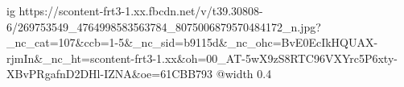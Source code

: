  
 
 
 
 

\ifcmt
  ig https://scontent-frt3-1.xx.fbcdn.net/v/t39.30808-6/269753549_4764998583563784_8075006879570484172_n.jpg?_nc_cat=107&ccb=1-5&_nc_sid=b9115d&_nc_ohc=BvE0EcIkHQUAX-rjmIn&_nc_ht=scontent-frt3-1.xx&oh=00_AT-5wX9zS8RTC96VXYrc5P6xty-XBvPRgafnD2DHl-IZNA&oe=61CBB793
  @width 0.4
\fi
